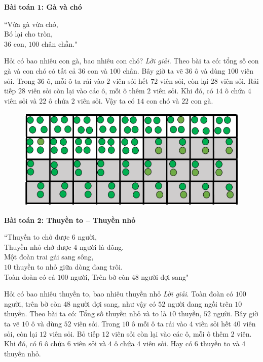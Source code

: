 \begin{multicols}{2}
	\vskip 0.1cm
	\textbf{\color{diendantoanhoc}Bài toán $\pmb{1}$: Gà và chó}
	\begin{center}
		``Vừa gà vừa chó,\\
		Bó lại cho tròn,\\
		$36$ con, $100$ chân chẵn."
	\end{center}
	Hỏi có bao nhiêu con gà, bao nhiêu con chó?
	\vskip 0.1cm
	\textit{Lời giải.}
	Theo bài ta có: tổng số con gà và con chó có tất cả $36$ con và $100$ chân.
	\vskip 0.1cm
	Bây giờ ta vẽ $36$ ô và dùng $100$ viên sỏi. Trong $36$ ô, mỗi ô ta rải vào $2$ viên sỏi hết $72$ viên sỏi, còn lại $28$ viên sỏi. Rải tiếp $28$ viên sỏi còn lại vào các ô, mỗi ô thêm $2$ viên sỏi. Khi đó, có $14$ ô chứa $4$ viên sỏi và $22$ ô chứa $2$ viên sỏi. Vậy ta có $14$ con chó và $22$ con gà.
	\begin{figure}[H]
		\vspace*{-5pt}
		\centering
		\captionsetup{labelformat= empty, justification=centering}
		\includegraphics[width= 1\linewidth]{1}
		\vspace*{-15pt}
	\end{figure}
	\textbf{\color{diendantoanhoc}Bài toán $\pmb2$: Thuyền to -- Thuyền nhỏ}
	\begin{center}
		``Thuyền to chở được $6$ người,\\
		Thuyền nhỏ chở được $4$ người là đông.\\
		Một đoàn trai gái sang sông,\\
		$10$ thuyền to nhỏ giữa dòng đang trôi.\\
		Toàn đoàn có cả $100$ người, Trên bờ còn $48$ người đợi sang"
	\end{center}
	Hỏi có bao nhiêu thuyền to, bao nhiêu thuyền nhỏ
	\vskip 0.1cm
	\textit{Lời giải}.
	Toàn đoàn có $100$ người, trên bờ còn $48$ người đợi sang, như vậy có $52$ người đang ngồi trên $10$ thuyền.
	\vskip 0.1cm
	Theo bài ta có: Tổng số thuyền nhỏ và to là $10$ thuyền, $52$ người.
	\vskip 0.1cm
	Bây giờ ta vẽ $10$ ô và dùng $52$ viên sỏi. Trong $10$ ô mỗi ô ta rải vào $4$ viên sỏi hết $40$ viên sỏi, còn lại $12$ viên sỏi. Bỏ tiếp $12$ viên sỏi còn lại vào các ô, mỗi ô thêm $2$ viên. Khi đó, có $6$ ô chứa $6$ viên sỏi và $4$ ô chứa $4$ viên sỏi. Hay có $6$ thuyền to và $4$ thuyền nhỏ.

\end{multicols}
